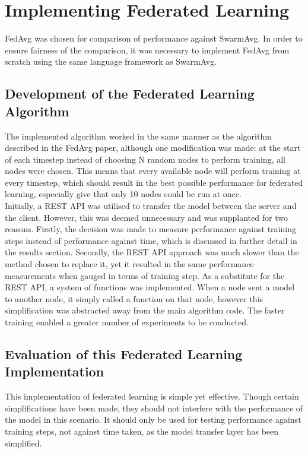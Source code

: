 \section{Implementing Federated Learning}
FedAvg was chosen for comparison of performance against SwarmAvg. In order to ensure fairness of the comparison, it was necessary to implement FedAvg from scratch using the same language framework as SwarmAvg.
\subsection{Development of the Federated Learning Algorithm}
The implemented algorithm worked in the same manner as the algorithm described in the FedAvg paper, although one modification was made: at the start of each timestep instead of choosing N random nodes to perform training, all nodes were chosen. This means that every available node will perform training at every timestep, which should result in the best possible performance for federated learning, especially give that only 10 nodes could be run at once. \\

Initially, a REST API was utilised to transfer the model between the server and the client. However, this was deemed unnecessary and was supplanted for two reasons. Firstly, the decision was made to measure performance against training steps instead of performance against time, which is discussed in further detail in the results section. Secondly, the REST API approach was much slower than the method chosen to replace it, yet it resulted in the same performance measurements when gauged in terms of training step. As a substitute for the REST API, a system of functions was implemented. When a node sent a model to another node, it simply called a function on that node, however this simplification was abstracted away from the main algorithm code. The faster training  enabled a greater number of experiments to be conducted.

\subsection{Evaluation of this Federated Learning Implementation}
This implementation of federated learning is simple yet effective. Though certain simplifications have been made, they should not interfere with the performance of the model in this scenario. It should only be used for testing performance against training steps, not against time taken, as the model transfer layer has been simplified.

